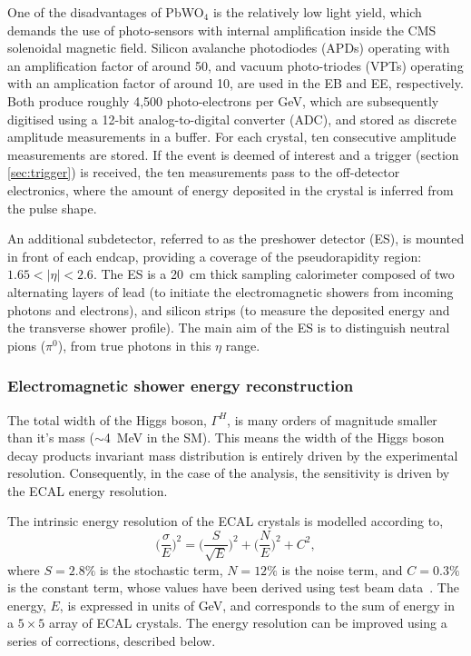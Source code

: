 One of the disadvantages of PbWO$_4$ is the relatively low light yield, which demands the use of photo-sensors with internal amplification inside the CMS solenoidal magnetic field. Silicon avalanche photodiodes (APDs) operating with an amplification factor of around 50, and vacuum photo-triodes (VPTs) operating with an amplication factor of around 10, are used in the EB and EE, respectively. Both produce roughly 4,500 photo-electrons per GeV, which are subsequently digitised using a 12-bit analog-to-digital converter (ADC), and stored as discrete amplitude measurements in a buffer. For each crystal, ten consecutive amplitude measurements are stored. If the event is deemed of interest and a trigger (section \ref{sec:trigger}) is received, the ten measurements pass to the off-detector electronics, where the amount of energy deposited in the crystal is inferred from the pulse shape.

An additional subdetector, referred to as the preshower detector (ES), is mounted in front of each endcap, providing a coverage of the pseudorapidity region: $1.65<|\eta|<2.6$. The ES is a 20~cm thick sampling calorimeter composed of two alternating layers of lead (to initiate the electromagnetic showers from incoming photons and electrons), and silicon strips (to measure the deposited energy and the transverse shower profile). The main aim of the ES is to distinguish neutral pions ($\pi^0$), from true photons in this $\eta$ range. 

\subsubsection{Electromagnetic shower energy reconstruction}
The total width of the Higgs boson, $\Gamma^H$, is many orders of magnitude smaller than it's mass ($\sim$4~MeV in the SM). This means the width of the Higgs boson decay products invariant mass distribution is entirely driven by the experimental resolution. Consequently, in the case of the \Hgg analysis, the sensitivity is driven by the ECAL energy resolution.

The intrinsic energy resolution of the ECAL crystals is modelled according to,
\begin{equation}
    \Big(\frac{\sigma}{E}\Big)^2 =  \Big(\frac{S}{\sqrt{E}}\Big)^2 + \Big(\frac{N}{E}\Big)^2 + C^2,
\end{equation}
\noindent
where $S=2.8\%$ is the stochastic term, $N=12\%$ is the noise term, and $C=0.3\%$ is the constant term, whose values have been derived using test beam data~\cite{Chatrchyan:2008zzk}. The energy, $E$, is expressed in units of GeV, and corresponds to the sum of energy in a $5\times5$ array of ECAL crystals. The energy resolution can be improved using a series of corrections, described below.

